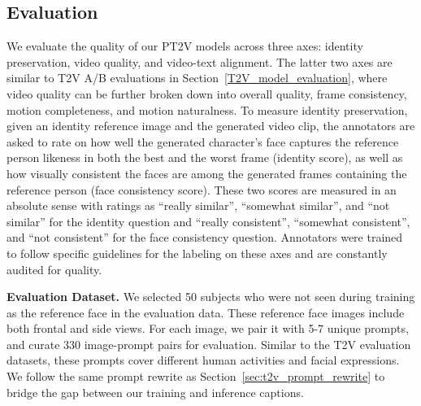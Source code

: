\subsection{Evaluation}
\label{sec:pt2v_eval}

We evaluate the quality of our PT2V models across three axes: identity preservation, video quality, and video-text alignment. The latter two axes are similar to T2V A/B evaluations in Section~\ref{T2V_model_evaluation}, where video quality can be further broken down into overall quality, frame consistency, motion completeness, and motion naturalness. To measure identity preservation, given an identity reference image and the generated video clip, the annotators are asked to rate on how well the generated character's face captures the reference person likeness in both the best and the worst frame (identity score), as well as how visually consistent the faces are among the generated frames containing the reference person (face consistency score). These two scores are measured in an absolute sense with ratings as ``really similar'', ``somewhat similar'', and ``not similar'' for the identity question and ``really consistent'', ``somewhat consistent'', and ``not consistent'' for the face consistency question. Annotators were trained to follow specific guidelines for the labeling on these axes and are constantly audited for quality.

\noindent\textbf{Evaluation Dataset.}
We selected 50 subjects who were not seen during training as the reference face in the evaluation data.
These reference face images include both frontal and side views.
For each image, we pair it with 5-7 unique prompts, and curate 330 image-prompt pairs for evaluation.
Similar to the T2V evaluation datasets, these prompts cover different human activities and facial expressions. We follow the same prompt rewrite as Section~\ref{sec:t2v_prompt_rewrite} to bridge the gap between our training and inference captions.
